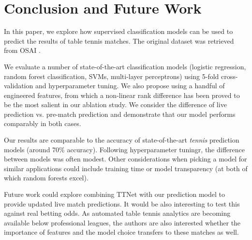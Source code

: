 \section{Conclusion and Future Work} \label{sec:conc}
In this paper, we explore how supervised classification models can be used to predict the results of table tennis matches.  The original dataset was retrieved from OSAI \cite{OSAI}.

We evaluate a number of state-of-the-art classification models (logistic regression, random forest classification, SVMs, multi-layer perceptrons) using 5-fold cross-validation and hyperparameter tuning. We also propose using a handful of engineered features, from which a non-linear rank difference has been proved to be the most salient in our ablation study. We consider the difference of live prediction vs. pre-match prediction and demonstrate that our model performs comparably in both cases.

Our results are comparable to the accuracy of state-of-the-art \textit{tennis} prediction models (around 70\% accuracy). Following hyperparameter tuningr, the difference between models was often modest. Other considerations when picking a model for similar applications could include training time or model transparency (at both of which random forests excel). 

Future work could explore combining TTNet with our prediction model to provide updated live match predictions. It would be also interesting to test this against real betting odds. As automated table tennis analytics are becoming available below professional leagues, the authors are also interested whether the importance of features and the model choice transfers to these matches as well.


